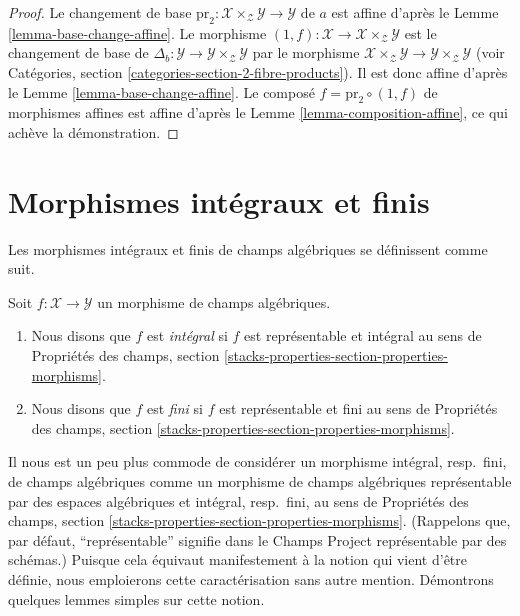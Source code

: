 \begin{proof}
Le changement de base
$\text{pr}_2 : \mathcal{X} \times_\mathcal{Z} \mathcal{Y} \to \mathcal{Y}$
de $a$ est affine d'après le Lemme \ref{lemma-base-change-affine}. Le morphisme
$(1, f) : \mathcal{X} \to \mathcal{X} \times_\mathcal{Z} \mathcal{Y}$
est le changement de base de
$\Delta_b : \mathcal{Y} \to \mathcal{Y} \times_\mathcal{Z} \mathcal{Y}$
par le morphisme $\mathcal{X} \times_\mathcal{Z} \mathcal{Y} \to
\mathcal{Y} \times_\mathcal{Z} \mathcal{Y}$ (voir Catégories, section
\ref{categories-section-2-fibre-products}). Il est donc affine d'après le
Lemme \ref{lemma-base-change-affine}. Le composé
$f = \text{pr}_2 \circ (1, f)$ de morphismes affines est affine d'après le
Lemme \ref{lemma-composition-affine}, ce qui achève la démonstration.
\end{proof}





\section{Morphismes intégraux et finis}
\label{section-integral}

\noindent
Les morphismes intégraux et finis de champs algébriques se définissent comme
suit.

\begin{definition}
\label{definition-integral}
Soit $f : \mathcal{X} \to \mathcal{Y}$ un morphisme de champs algébriques.
\begin{enumerate}
\item Nous disons que $f$ est {\it intégral} si $f$ est représentable et
intégral au sens de Propriétés des champs, section
\ref{stacks-properties-section-properties-morphisms}.
\item Nous disons que $f$ est {\it fini} si $f$ est représentable et fini au
sens de Propriétés des champs, section
\ref{stacks-properties-section-properties-morphisms}.
\end{enumerate}
\end{definition}

\noindent
Il nous est un peu plus commode de considérer un morphisme intégral, resp.\
fini, de champs algébriques comme un morphisme de champs algébriques
représentable par des espaces algébriques et intégral, resp.\ fini, au sens de
Propriétés des champs, section
\ref{stacks-properties-section-properties-morphisms}.
(Rappelons que, par défaut, ``représentable'' signifie dans le Champs Project
représentable par des schémas.) Puisque cela équivaut manifestement à la notion
qui vient d'être définie, nous emploierons cette caractérisation sans autre
mention. Démontrons quelques lemmes simples sur cette notion.

